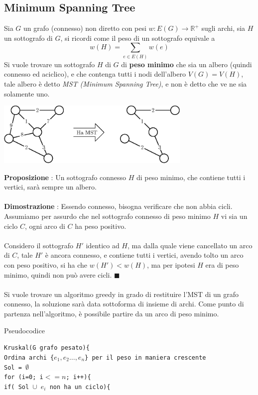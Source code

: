 \documentclass[12pt, letterpaper]{article}
\newcommand{\codee}[1]{\colorbox{white}{\texttt{#1}}}
\newcommand{\acc}{\\\hphantom{}\\}
\begin{document}
\subsection{Minimum Spanning Tree} 
Sia $G$ un grafo (connesso) non diretto con pesi $w:E(G)\rightarrow \mathbb{R}^+$ sugli archi, sia $H$ un sottografo di $G$, si ricordi come il peso di 
un sottografo equivale a 
$$ w(H)=\sum_{e\in E(H)}w(e)$$
Si vuole trovare un sottografo $H$ di $G$ di \textbf{peso minimo} che sia un albero (quindi connesso ed aciclico), e che contenga tutti i nodi 
dell'albero $V(G)=V(H)$, tale albero è detto \textit{MST (Minimum Spanning Tree)}, e non è detto che ve ne sia solamente uno.\begin{center}
    \includegraphics[width=0.7\textwidth ]{images/MST.eps}
\end{center}
\textbf{Proposizione} : Un sottografo connesso $H$ di peso minimo, che contiene tutti i vertici, sarà sempre un albero.\acc 
\textbf{Dimostrazione} : Essendo connesso, bisogna verificare che non abbia cicli. Assumiamo per assurdo che nel sottografo 
connesso di peso minimo $H$ vi sia un ciclo $C$, ogni arco di $C$ ha peso positivo. \acc Considero il sottografo $H'$ identico 
ad $H$, ma dalla quale viene cancellato un arco di $C$, tale $H'$ è ancora connesso, e contiene tutti i vertici, avendo tolto 
un arco con peso positivo, si ha che $w(H')<w(H)$, ma per ipotesi $H$ era di peso minimo, quindi non può avere cicli. $\blacksquare$\acc 
Si vuole trovare un algoritmo greedy in grado di restituire l'MST di un grafo connesso, la soluzione sarà data 
sottoforma di insieme di archi. Come punto di partenza nell'algoritmo, è possibile partire da un arco di peso minimo.\begin{center}
    Pseudocodice
\end{center}
\codee{Kruskal(G grafo pesato)\{}\\
\hphantom{ident}\codee{Ordina archi \{$e_1,e_2\dots,e_n$\} per il peso in maniera crescente}\\
\hphantom{ident}\codee{Sol = $\emptyset$}\\
\hphantom{ident}\codee{for (i=0; i$<=n$; i++)\{}\\
\hphantom{ident}\hphantom{ident}\codee{if( Sol $\cup$ $e_i$ non ha un ciclo)\{}\\
\end{document}
